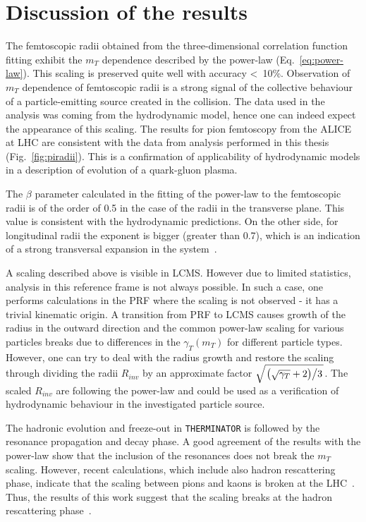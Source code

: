 

      \FloatBarrier
  \section{Discussion of the results}
    The femtoscopic radii obtained from the three-dimensional correlation function fitting exhibit the $m_T$ dependence described by the power-law (Eq.~\ref{eq:power-law}).
    This scaling is preserved quite well with accuracy <~10\%.
    Observation of $m_T$ dependence of femtoscopic radii is a strong signal of the collective behaviour of a particle-emitting source created in the collision.
    The data used in the analysis was coming from the hydrodynamic model, hence one can indeed expect the appearance of this scaling.
    The results for pion femtoscopy from the ALICE at LHC are consistent with the data from analysis performed in this thesis (Fig.~\ref{fig:piradii}).
    This is a confirmation of applicability of hydrodynamic models in a description of evolution of a quark-gluon plasma.

    The $\beta$ parameter calculated in the fitting of the power-law to the femtoscopic radii is of the order of 0.5 in the case of the radii in the transverse plane.
    This value is consistent with the hydrodynamic predictions.
    On the other side, for longitudinal radii the exponent is bigger (greater than 0.7), which is an indication of a strong transversal expansion in the system~\cite{akkelin_sinyukov}.

    A scaling described above is visible in LCMS.
    However due to limited statistics, analysis in this reference frame is not always possible.
    In such a case, one performs calculations in the PRF where the scaling is not observed - it has a trivial kinematic origin.
    A transition from PRF to LCMS causes growth of the radius in the outward direction and the common power-law scaling for various particles breaks due to differences in the $\gamma_T (m_T)$ for different particle types.
    However, one can try to deal with the radius growth and restore the scaling through dividing the radii $R_{inv}$ by an approximate factor $\sqrt{ \left. \left( \sqrt{\gamma_T} + 2 \right) \middle/ 3 \right. }$.
    The scaled $R_{inv}$ are following the power-law and could be used as a verification of hydrodynamic behaviour in the investigated particle source.

    The hadronic evolution and freeze-out in \verb|THERMINATOR| is followed by the resonance propagation and decay phase.
    A good agreement of the results with the power-law show that the inclusion of the resonances does not break the $m_T$ scaling.
    However, recent calculations, which include also hadron rescattering phase, indicate that the scaling between pions and kaons is broken at the LHC~\cite{sinyukov_kaon}.
    Thus, the results of this work suggest that the scaling breaks at the hadron rescattering phase~\cite{galazyn}.
